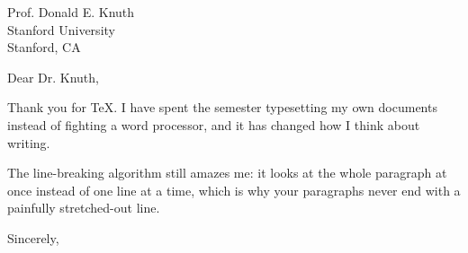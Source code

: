 \documentclass{letter}
\begin{document}
\begin{letter}{Prof. Donald E. Knuth \\ Stanford University \\ Stanford, CA}

\opening{Dear Dr. Knuth,}

Thank you for \TeX{}. I have spent the semester typesetting my own
documents instead of fighting a word processor, and it has changed how
I think about writing.

The line-breaking algorithm still amazes me: it looks at the whole
paragraph at once instead of one line at a time, which is why your
paragraphs never end with a painfully stretched-out line.

\closing{Sincerely,}

\end{letter}
\end{document}
